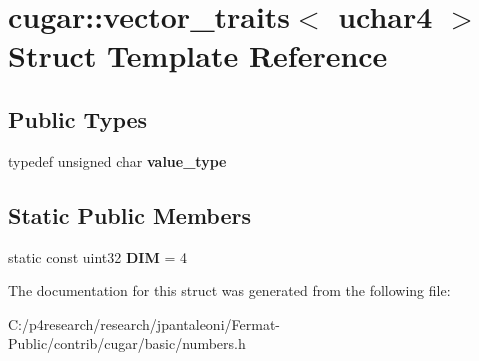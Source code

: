 \hypertarget{structcugar_1_1vector__traits_3_01uchar4_01_4}{}\section{cugar\+:\+:vector\+\_\+traits$<$ uchar4 $>$ Struct Template Reference}
\label{structcugar_1_1vector__traits_3_01uchar4_01_4}
\subsection*{Public Types}
\begin{DoxyCompactItemize}
\item 
\mbox{\label{structcugar_1_1vector__traits_3_01uchar4_01_4_ace47a3fa006fffb8179d56855e3fb6a5}} 
typedef unsigned char {\bfseries value\+\_\+type}
\end{DoxyCompactItemize}
\subsection*{Static Public Members}
\begin{DoxyCompactItemize}
\item 
\mbox{\label{structcugar_1_1vector__traits_3_01uchar4_01_4_ac654f21763ff340dbea625007f98f6a1}} 
static const uint32 {\bfseries D\+IM} = 4
\end{DoxyCompactItemize}


The documentation for this struct was generated from the following file\+:\begin{DoxyCompactItemize}
\item 
C\+:/p4research/research/jpantaleoni/\+Fermat-\/\+Public/contrib/cugar/basic/numbers.\+h\end{DoxyCompactItemize}
